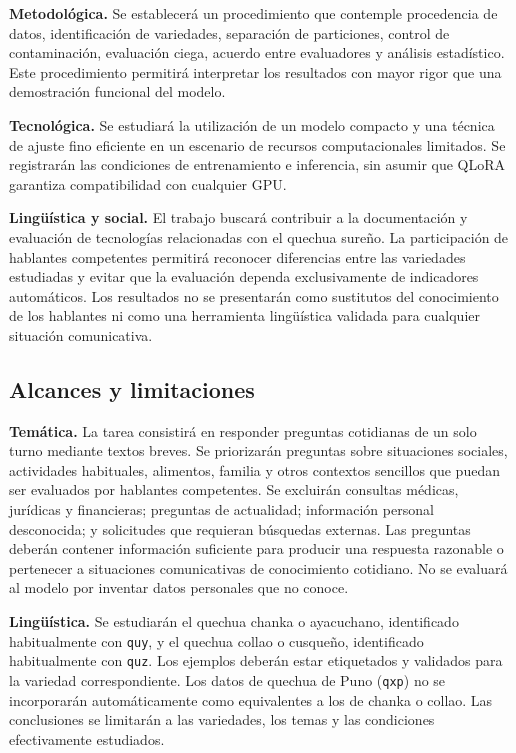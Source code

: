 \noindent\textbf{Metodológica.} Se establecerá un procedimiento que contemple procedencia de datos, identificación de variedades, separación de particiones, control de contaminación, evaluación ciega, acuerdo entre evaluadores y análisis estadístico. Este procedimiento permitirá interpretar los resultados con mayor rigor que una demostración funcional del modelo.

\noindent\textbf{Tecnológica.} Se estudiará la utilización de un modelo compacto y una técnica de ajuste fino eficiente en un escenario de recursos computacionales limitados. Se registrarán las condiciones de entrenamiento e inferencia, sin asumir que QLoRA garantiza compatibilidad con cualquier GPU.

\noindent\textbf{Lingüística y social.} El trabajo buscará contribuir a la documentación y evaluación de tecnologías relacionadas con el quechua sureño. La participación de hablantes competentes permitirá reconocer diferencias entre las variedades estudiadas y evitar que la evaluación dependa exclusivamente de indicadores automáticos. Los resultados no se presentarán como sustitutos del conocimiento de los hablantes ni como una herramienta lingüística validada para cualquier situación comunicativa.

\subsection{Alcances y limitaciones}\label{alcances-limitaciones}

\noindent\textbf{Temática.} La tarea consistirá en responder preguntas cotidianas de un solo turno mediante textos breves. Se priorizarán preguntas sobre situaciones sociales, actividades habituales, alimentos, familia y otros contextos sencillos que puedan ser evaluados por hablantes competentes. Se excluirán consultas médicas, jurídicas y financieras; preguntas de actualidad; información personal desconocida; y solicitudes que requieran búsquedas externas. Las preguntas deberán contener información suficiente para producir una respuesta razonable o pertenecer a situaciones comunicativas de conocimiento cotidiano. No se evaluará al modelo por inventar datos personales que no conoce.

\noindent\textbf{Lingüística.} Se estudiarán el quechua chanka o ayacuchano, identificado habitualmente con \texttt{quy}, y el quechua collao o cusqueño, identificado habitualmente con \texttt{quz}. Los ejemplos deberán estar etiquetados y validados para la variedad correspondiente. Los datos de quechua de Puno (\texttt{qxp}) no se incorporarán automáticamente como equivalentes a los de chanka o collao. Las conclusiones se limitarán a las variedades, los temas y las condiciones efectivamente estudiados.

